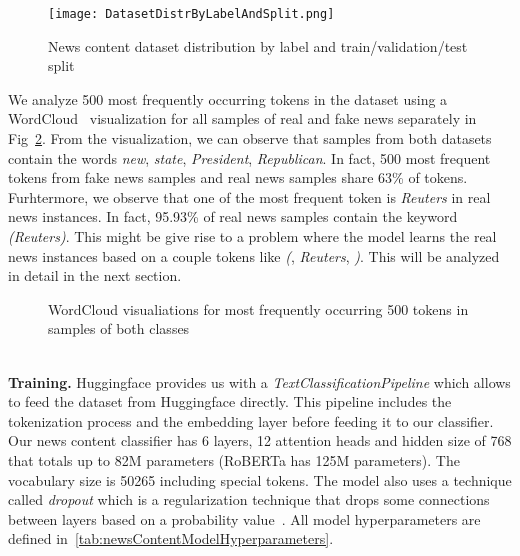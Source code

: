 \begin{figure}
    \centering
    \texttt{[image: DatasetDistrByLabelAndSplit.png]}
    \caption[News content dataset distribution by label and train/validation/test split]{News content dataset distribution by label and train/validation/test split}
    \label{fig:DatasetDistributionByLabelAndSplit}
\end{figure}
We analyze 500 most frequently occurring tokens in the dataset using a WordCloud~\parencite{WordCloud_Oesper} visualization for all samples of real and fake news separately in Fig~\ref{fig:WordCloudVisualizations}. From the visualization, we can observe that samples from both datasets contain the words \emph{new}, \emph{state}, \emph{President}, \emph{Republican}. In fact, 500 most frequent tokens from fake news samples and real news samples share 63\% of tokens. Furhtermore, we observe that one of the most frequent token is \emph{Reuters} in real news instances. In fact, 95.93\% of real news samples contain the keyword \emph{(Reuters)}. This might be give rise to a problem where the model learns the real news instances based on a couple tokens like \emph{(}, \emph{Reuters}, \emph{)}. This will be analyzed in detail in the next section.
\pagebreak
\begin{figure}
    \centering
    \hfill
    \caption[WordCloud visualiations for most frequently occurring 500 tokens in both classes]{WordCloud visualiations for most frequently occurring 500 tokens in samples of both classes}
    \label{fig:WordCloudVisualizations}
\end{figure}\\
\textbf{Training.} Huggingface provides us with a \emph{TextClassificationPipeline} which allows to feed the dataset from Huggingface directly\parencite{Transformers_Wolf}. This pipeline includes the tokenization process and the embedding layer before feeding it to our classifier. Our news content classifier has 6 layers, 12 attention heads and  hidden size of 768 that totals up to 82M parameters (RoBERTa has 125M parameters). The vocabulary size is 50265 including special tokens. The model also uses a technique called \emph{dropout} which is a regularization technique that drops some connections between layers based on a probability value~\parencite{Dropout_Nitish}. All model hyperparameters are defined in~\ref{tab:newsContentModelHyperparameters}.\\
